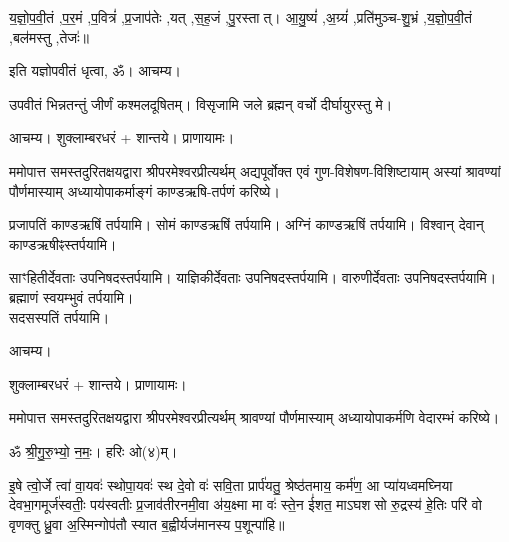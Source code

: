 
य॒ज्ञो॒प॒वी॒तं \sep प॒र॒मं \sep प॒वित्रं॑ \sep प्र॒जाप॑तेः \sep यत् \sep स॒ह॒जं \sep पु॒रस्तात्। आ॒यु॒ष्यं॑ \sep अ॒ग्र्यं॑ \sep प्रति॑मुञ्च-शु॒भ्रं \sep य॒ज्ञो॒प॒वी॒तं \sep बल॑मस्तु \sep तेजः॑॥

इति यज्ञोपवीतं धृत्वा, ॐ। आचम्य।

उपवीतं भिन्नतन्तुं जीर्णं कश्मलदूषितम्। विसृजामि जले ब्रह्मन् वर्चो दीर्घायुरस्तु मे।



आचम्य। शुक्लाम्बरधरं + शान्तये। प्राणायामः।

ममोपात्त समस्तदुरितक्षयद्वारा श्रीपरमेश्वरप्रीत्यर्थम्
अद्य\-पूर्वोक्त एवं गुण-विशेषण-विशिष्टायाम्
अस्यां श्रावण्यां पौर्णमास्याम् अध्यायोपाकर्माङ्गं काण्डऋषि-तर्पणं करिष्ये।


प्रजापतिं काण्डऋषिं तर्पयामि। 
सोमं काण्डऋषिं तर्पयामि। 
अग्निं काण्डऋषिं तर्पयामि। 
विश्वान् देवान् काण्डऋषीꣴ\-स्तर्पयामि।

साꣳहितीर्देवताः उपनिषद\-स्तर्पयामि। 
याज्ञिकीर्देवताः उपनिषद\-स्तर्पयामि। 
वारुणीर्देवताः उपनिषद\-स्तर्पयामि। 
ब्रह्माणं स्वयम्भुवं तर्पयामि। %
\\
सदसस्पतिं तर्पयामि।

आचम्य।




शुक्लाम्बरधरं + शान्तये। प्राणायामः।

ममोपात्त समस्तदुरितक्षयद्वारा श्रीपरमेश्वरप्रीत्यर्थम्
श्रावण्यां पौर्णमास्याम् अध्यायोपाकर्मणि वेदारम्भं करिष्ये।


ॐ श्री॒गु॒रु॒भ्यो॒ न॒मः॒। हरिः ओ(४)म्।

इ॒षे त्वो॒र्जे त्वा॑ वा॒यवः॑ स्थोपा॒यवः॑ स्थ दे॒वो वः॑ सवि॒ता प्रार्प॑यतु॒ श्रेष्ठ॑तमाय॒ कर्म॑ण॒ आ
प्या॑यध्वमघ्निया देवभा॒गमूर्ज॑स्वतीः॒ पय॑स्वतीः प्र॒जाव॑तीरनमी॒वा अ॑य॒क्ष्मा मा वः॑ स्ते॒न ई॑शत॒
माऽघशसो रु॒द्रस्य॑ हे॒तिः परि॑ वो वृणक्तु ध्रु॒वा अ॒स्मिन्गोप॑तौ स्यात ब॒ह्वीर्यज॑मानस्य
प॒शून्पा॑हि॥ %

